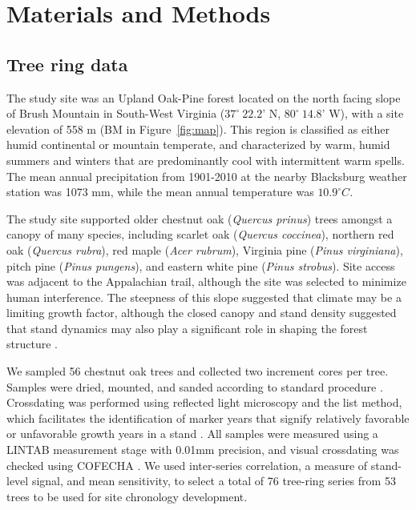 
\section{Materials and Methods} \label{sec:meth}

\subsection{Tree ring data}

The study site was an Upland Oak-Pine forest located on the north
facing slope of Brush Mountain in South-West Virginia  ($37^{\circ}
\ 22.2$' N, $80^{\circ}\ 14.8$' W), with a site elevation of 558 m
(BM in Figure~\ref{fig:map}). This region is classified as either
humid continental or mountain temperate, and characterized by warm,
humid summers and winters that are predominantly cool with intermittent
warm spells. The mean annual precipitation from 1901-2010 at the nearby
Blacksburg weather station was 1073 mm, while the mean annual temperature
was $10.9^{\circ} C$.

The study site supported older chestnut oak (\textit{Quercus
prinus}) trees amongst a canopy of many species, including scarlet
oak (\textit{Quercus coccinea}), northern red oak (\textit{Quercus
rubra}), red maple (\textit{Acer rubrum}), Virginia pine (\textit{Pinus
virginiana}), pitch pine (\textit{Pinus pungens}), and eastern white pine
(\textit{Pinus strobus}). Site access was adjacent to the Appalachian
trail, although the site was selected to minimize human interference. The
steepness of this slope suggested that climate may be a limiting growth
factor, although the closed canopy and stand density suggested that
stand dynamics may also play a significant role in shaping the forest
structure \cite{fritts1976tree}.

We sampled 56 chestnut oak trees and collected two increment cores per
tree. Samples were dried, mounted, and sanded according to standard
procedure \cite{stokes1996introduction}. Crossdating was performed using
reflected light microscopy and the list method, which facilitates the
identification of marker years that signify relatively favorable or
unfavorable growth years in a stand \cite{yamaguchi1991simple}. All
samples were measured using a LINTAB measurement stage with
0.01mm precision, and visual crossdating was checked using COFECHA
\cite{holmes1983computer}. We used inter-series correlation, a measure
of stand-level signal, and mean sensitivity, to select a total of 76
tree-ring series from 53 trees to be used for site chronology development.


